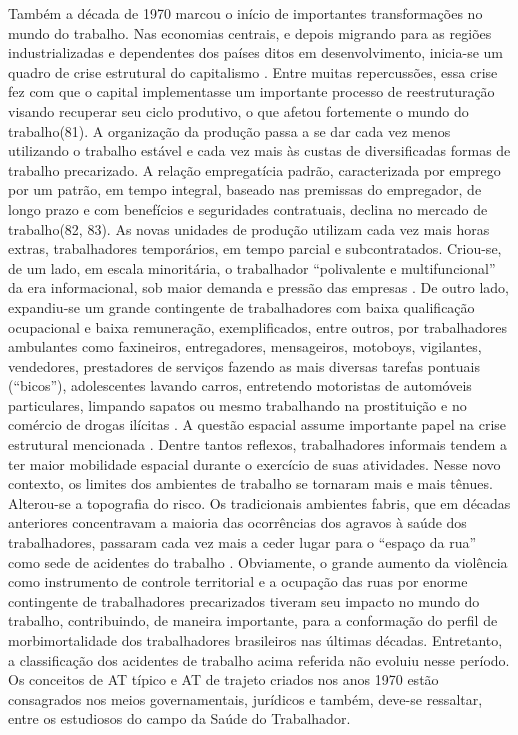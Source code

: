 Também a década de 1970 marcou o início de importantes transformações no mundo do trabalho. Nas economias centrais, e depois migrando para as regiões industrializadas e dependentes dos países ditos em desenvolvimento, inicia-se um quadro de crise estrutural do capitalismo \citep{meszaros1995beyond, polanyi2002rethinking}. Entre muitas repercussões, essa crise fez com que o capital implementasse um importante processo de reestruturação visando recuperar seu ciclo produtivo, o que afetou fortemente o mundo do trabalho(81). A organização da produção passa a se dar cada vez menos utilizando o trabalho estável e cada vez mais às custas de diversificadas formas de trabalho precarizado. A relação empregatícia padrão, caracterizada por emprego por um patrão, em tempo integral, baseado nas premissas do empregador, de longo prazo e com benefícios e seguridades contratuais, declina no mercado de trabalho(82, 83). As novas unidades de produção utilizam cada vez mais horas extras, trabalhadores temporários, em tempo parcial e subcontratados. Criou-se, de um lado, em escala minoritária, o trabalhador “polivalente e multifuncional” da era informacional, sob maior demanda e pressão das empresas \citep{polanyi2002rethinking}. De outro lado, expandiu-se um grande contingente de trabalhadores com baixa qualificação ocupacional e baixa remuneração, exemplificados, entre outros, por trabalhadores ambulantes como faxineiros, entregadores, mensageiros, motoboys, vigilantes, vendedores, prestadores de serviços fazendo as mais diversas tarefas pontuais (“bicos”), adolescentes lavando carros, entretendo motoristas de automóveis particulares, limpando sapatos ou mesmo trabalhando na prostituição e no comércio de drogas ilícitas \citep{meirelles1998vida, myers1988alternative}. A questão espacial assume importante papel na crise estrutural mencionada \citep{botelho2000fordismo}. Dentre tantos reflexos, trabalhadores informais tendem a ter maior mobilidade espacial durante o exercício de suas atividades. Nesse novo contexto, os limites dos ambientes de trabalho se tornaram mais e mais tênues. Alterou-se a topografia do risco. Os tradicionais ambientes fabris, que em décadas anteriores concentravam a maioria das ocorrências dos agravos à saúde dos trabalhadores, passaram cada vez mais a ceder lugar para o “espaço da rua” como sede de acidentes do trabalho \citep{machado1994acidentes, waldvogel1999acidentes, hennington2004trabalho}. Obviamente, o grande aumento da violência como instrumento de controle territorial e a ocupação das ruas por enorme contingente de trabalhadores precarizados tiveram seu impacto no mundo do trabalho, contribuindo, de maneira importante, para a conformação do perfil de morbimortalidade dos trabalhadores brasileiros nas últimas décadas. Entretanto, a classificação dos acidentes de trabalho acima referida não evoluiu nesse período. Os conceitos de AT típico e AT de trajeto criados nos anos 1970 estão consagrados nos meios governamentais, jurídicos e também, deve-se ressaltar, entre os estudiosos do campo da Saúde do Trabalhador.

